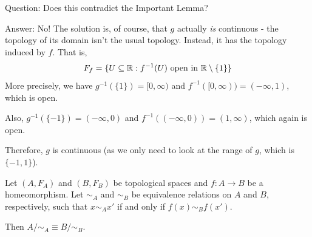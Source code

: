 Question: Does this contradict the Important Lemma?

Answer: No! The solution is, of course, that $g$ actually \emph{is} continuous - the topology of its domain isn't the usual topology. Instead, it has the topology induced by $f$. That is,
\[F_f = \{ U\subseteq \mathbb R : f^{-1}(U)\text{ open in }\mathbb R\setminus\{1\} \}\]
More precisely, we have $g^{-1}(\{ 1\}) = [0, \infty)$ and $f^{-1}([0, \infty)) = (-\infty,1)$, which is open.

Also, $g^{-1}( \{-1 \} ) = (-\infty,0)$ and $f^{-1}((-\infty, 0)) = (1, \infty)$, which again is open.

Therefore, $g$ is continuous (as we only need to look at the range of $g$, which is $\{-1, 1\}$). 
\begin{theorem}
	Let $(A, F_A)$ and $(B, F_B)$ be topological spaces and $f:A\to B$ be a homeomorphism. Let $\sim_A$ and $\sim_B$ be equivalence relations on $A$ and $B$, respectively, such that $x\sim_A x'$ if and only if $f(x) \sim_B f(x')$.
	
	Then $A/\sim_A \equiv B/\sim_B$. 
\end{theorem}
